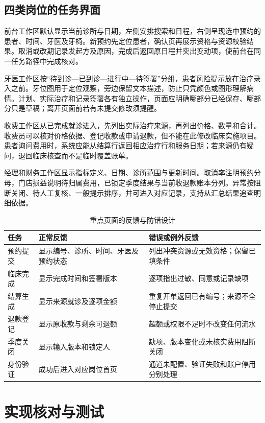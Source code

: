 \documentclass[12pt,a4paper,fontset=windows]{ctexart}
\begin{document}
\subsection{四类岗位的任务界面}
前台工作区默认显示当前诊所与日期，左侧安排搜索和日程，右侧呈现选中预约的患者、时间、牙医及牙椅。新预约先定位患者，确认页再展示资格与资源校验结果。取消或改期记录发起方及原因，完成后返回原日程并突出变动项，使前台在同一任务路径中完成核对。

牙医工作区按“待到诊—已到诊—进行中—待签署”分组，患者风险提示放在治疗录入之前。牙位图用于定位观察，旁边保留文本描述，防止只凭颜色或图形理解病情。计划、实际治疗和记录签署各有独立操作，页面应明确哪部分已经保存、哪部分只是草稿；离开页面前若有未提交修改须提醒。

收费工作区从已完成就诊进入，先列出实际治疗来源，再列出价格、数量和合计。收费员可以核对价格依据、登记收款或申请退款，但不能在此修改临床实施项目。患者询问费用时，系统应能从结算行返回相应治疗行和服务日期；若来源仍有疑问，退回临床核查而不是临时覆盖账单。

经理和财务工作区显示指标定义、日期、诊所范围与更新时间。取消率注明预约分母，门店损益说明待归属费用，已锁定季度结果与当前收退款账本分列。异常按阻断关闭、待人工复核、一般提示排序，并可进入对应记录，支持从汇总结果追查明细依据。

\begin{table}[!htbp]\centering\small
\caption{重点页面的反馈与防错设计}\label{tab:ui-feedback}
\begin{tabular}{@{}L{31mm}L{59mm}L{53mm}@{}}\toprule
任务 & 正常反馈 & 错误或例外反馈\\\midrule
预约提交 & 显示编号、诊所、时间、牙医及预约状态 & 列出冲突资源或无效资格；保留已填条件\\
临床完成 & 显示完成时间和签署版本 & 逐项指出过敏、同意或记录缺项\\
结算生成 & 显示来源就诊及逐项金额 & 重复开单返回已有编号；来源不全停止提交\\
退款登记 & 显示原收款与剩余可退额 & 超额或权限不足时不改变任何流水\\
季度关闭 & 显示输入版本和锁定人 & 缺项、版本变化或未核实费用阻断关闭\\
身份验证 & 成功后进入对应岗位首页 & 通道未配置、验证失败和账户停用分别处理\\
\bottomrule\end{tabular}\end{table}

\section{实现核对与测试}\label{sec:implementation}
\end{document}
